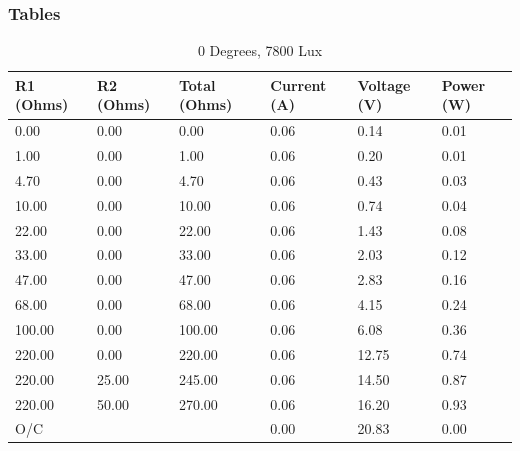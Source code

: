 \documentclass{article}
\begin{document}
	\subsubsection{Tables}
		\begin{table}[H]
			\centering
			\caption{0 Degrees, 7800 Lux}
			\begin{tabular}{|l|l|l|l|l|l|}
				\hline
				
				\textbf{R1 (Ohms)} & \textbf{R2 (Ohms)} & \textbf{Total (Ohms)} & \textbf{Current (A)} & \textbf{Voltage (V)} & \textbf{Power (W)} \\ \hline
				0.00 & 0.00 & 0.00 & 0.06 & 0.14 & 0.01 \\ \hline
				1.00 & 0.00 & 1.00 & 0.06 & 0.20 & 0.01 \\ \hline
				4.70 & 0.00 & 4.70 & 0.06 & 0.43 & 0.03 \\ \hline
				10.00 & 0.00 & 10.00 & 0.06 & 0.74 & 0.04 \\ \hline
				22.00 & 0.00 & 22.00 & 0.06 & 1.43 & 0.08 \\ \hline
				33.00 & 0.00 & 33.00 & 0.06 & 2.03 & 0.12 \\ \hline
				47.00 & 0.00 & 47.00 & 0.06 & 2.83 & 0.16 \\ \hline
				68.00 & 0.00 & 68.00 & 0.06 & 4.15 & 0.24 \\ \hline
				100.00 & 0.00 & 100.00 & 0.06 & 6.08 & 0.36 \\ \hline
				220.00 & 0.00 & 220.00 & 0.06 & 12.75 & 0.74 \\ \hline
				220.00 & 25.00 & 245.00 & 0.06 & 14.50 & 0.87 \\ \hline
				220.00 & 50.00 & 270.00 & 0.06 & 16.20 & 0.93 \\ \hline
				O/C & & & 0.00 & 20.83 & 0.00 \\ \hline
				
			\end{tabular}
		\end{table}
	
\end{document}
